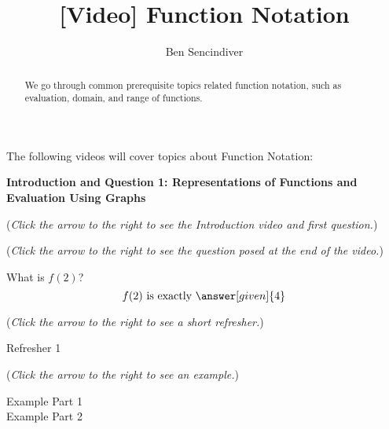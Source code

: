 \documentclass{ximera}
\title[Prerequisite Videos: ]{[Video] Function Notation}
\author{Ben Sencindiver}
\begin{document}
\begin{abstract}
  We go through common prerequisite topics related
  function notation, such as evaluation, domain,
  and range of functions.
\end{abstract}
\maketitle

The following videos will cover topics about Function Notation:

\textbf{Introduction and Question 1: Representations of 
Functions and Evaluation Using Graphs}

\begin{question}

\begin{flushright}
{\color{blue}(\emph{Click the arrow to the right
to see the Introduction video and first question.})}
\end{flushright}

\begin{center}
\begin{expandable}
{\color{blue}(\emph{Click the arrow to the right to see the question
posed at the end of the video.})}

\begin{expandable}

What is $f(2)$?\\

\[
f(2) \text{ is exactly }\answer[given]{4}
\]

\begin{flushright}
{\color{blue}(\emph{Click the arrow to the right to see a short refresher.})}
\end{flushright}
\begin{expandable}
Refresher 1
\end{expandable}
\begin{flushright}
{\color{blue}(\emph{Click the arrow to the right to see an example.})}
\end{flushright}
\begin{expandable}
Example Part 1
\\

Example Part 2
\end{expandable}
\end{expandable}
\end{expandable}
\end{center}
\end{question}
\end{document}
